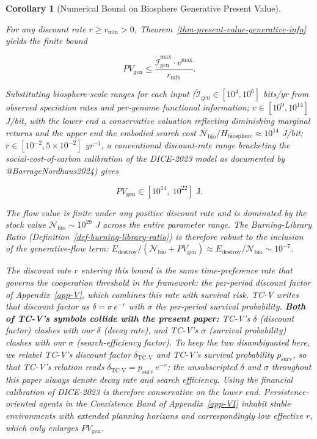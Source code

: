 \documentclass[11pt]{article}
\theoremstyle{plain}
\newtheorem{corollary}[theorem]{Corollary}
\theoremstyle{definition}
\theoremstyle{remark}
\begin{document}
\begin{corollary}[Numerical Bound on Biosphere Generative Present Value]
\label{cor-generative-pv-bound}

For any discount rate $r \geq r_{\min} > 0$, Theorem~\ref{thm-present-value-generative-info} yields the finite bound

$$PV_{\text{gen}} \leq \frac{\dot{\mathcal{I}}_{\text{gen}}^{\max} \cdot v^{\max}}{r_{\min}}.$$

Substituting biosphere-scale ranges for each input ($\dot{\mathcal{I}}_{\text{gen}} \in [10^4, 10^6]$ bits/yr from observed speciation rates and per-genome functional information; $v \in [10^9, 10^{14}]$ J/bit, with the lower end a conservative valuation reflecting diminishing marginal returns and the upper end the embodied search cost $\mathcal{N}_{\text{bio}}/H_{\text{biosphere}} \approx 10^{14}$ J/bit; $r \in [10^{-2}, 5 \times 10^{-2}]$ yr$^{-1}$, a conventional discount-rate range bracketing the social-cost-of-carbon calibration of the DICE-2023 model as documented by @BarrageNordhaus2024) gives

$$PV_{\text{gen}} \in \left[10^{14},\ 10^{22}\right] \text{ J}.$$

The flow value is finite under any positive discount rate and is dominated by the stock value $\mathcal{N}_{\text{bio}} \sim 10^{29}$ J across the entire parameter range. The Burning-Library Ratio (Definition~\ref{def-burning-library-ratio}) is therefore robust to the inclusion of the generative-flow term: $E_{\text{destroy}}/(\mathcal{N}_{\text{bio}} + PV_{\text{gen}}) \approx E_{\text{destroy}}/\mathcal{N}_{\text{bio}} \sim 10^{-7}$.

The discount rate $r$ entering this bound is the same time-preference rate that governs the cooperation threshold in the framework: the per-period discount factor of Appendix~\ref{app-V}, which combines this rate with survival risk. TC-V writes that discount factor as $\delta = \sigma\, e^{-r}$ with $\sigma$ the per-period survival probability. \textbf{Both of TC-V's symbols collide with the present paper:} TC-V's $\delta$ (discount factor) clashes with our $\delta$ (decay rate), and TC-V's $\sigma$ (survival probability) clashes with our $\sigma$ (search-efficiency factor). To keep the two disambiguated here, we relabel TC-V's discount factor $\delta_{\text{TC-V}}$ and TC-V's survival probability $p_{\text{surv}}$, so that TC-V's relation reads $\delta_{\text{TC-V}} = p_{\text{surv}}\, e^{-r}$; the unsubscripted $\delta$ and $\sigma$ throughout this paper always denote decay rate and search efficiency. Using the financial calibration of DICE-2023 \citep{BarrageNordhaus2024} is therefore conservative on the lower end. Persistence-oriented agents in the Coexistence Band of Appendix~\ref{app-VI} inhabit stable environments with extended planning horizons and correspondingly low effective $r$, which only enlarges $PV_{\text{gen}}$.


\end{corollary}
\end{document}
